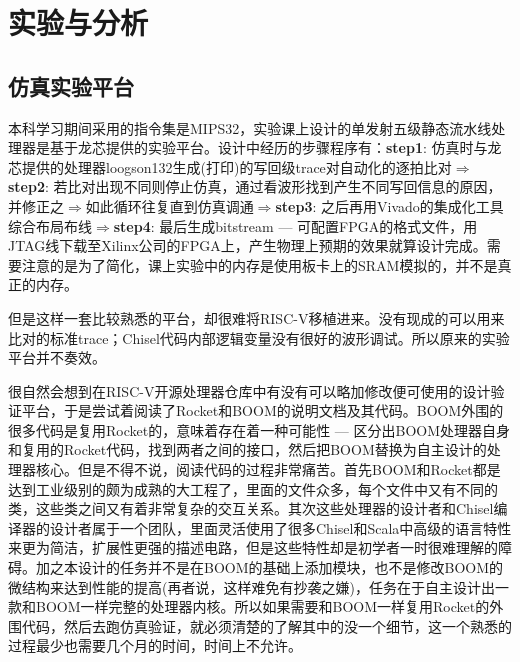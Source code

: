 \chapter{实验与分析}\label{chap:analysis}

\section{仿真实验平台}

本科学习期间采用的指令集是MIPS32，实验课上设计的单发射五级静态流水线处理器是基于龙芯提供的实验平台。设计中经历的步骤程序有：\textbf{step1}: 仿真时与龙芯提供的处理器loogson132生成(打印)的写回级trace对自动化的逐拍比对$ \Rightarrow $\textbf{step2}: 若比对出现不同则停止仿真，通过看波形找到产生不同写回信息的原因，并修正之$ \Rightarrow $如此循环往复直到仿真调通$ \Rightarrow $\textbf{step3}: 之后再用Vivado的集成化工具综合布局布线$ \Rightarrow $\textbf{step4}: 最后生成bitstream --- 可配置FPGA的格式文件，用JTAG线下载至Xilinx公司的FPGA上，产生物理上预期的效果就算设计完成。需要注意的是为了简化，课上实验中的内存是使用板卡上的SRAM模拟的，并不是真正的内存。

但是这样一套比较熟悉的平台，却很难将RISC-V移植进来。没有现成的可以用来比对的标准trace；Chisel代码内部逻辑变量没有很好的波形调试。所以原来的实验平台并不奏效。

很自然会想到在RISC-V开源处理器仓库中有没有可以略加修改便可使用的设计验证平台，于是尝试着阅读了Rocket和BOOM的说明文档及其代码。BOOM外围的很多代码是复用Rocket的，意味着存在着一种可能性 --- 区分出BOOM处理器自身和复用的Rocket代码，找到两者之间的接口，然后把BOOM替换为自主设计的处理器核心。但是不得不说，阅读代码的过程非常痛苦。首先BOOM和Rocket都是达到工业级别的颇为成熟的大工程了，里面的文件众多，每个文件中又有不同的类，这些类之间又有着非常复杂的交互关系。其次这些处理器的设计者和Chisel编译器的设计者属于一个团队，里面灵活使用了很多Chisel和Scala中高级的语言特性来更为简洁，扩展性更强的描述电路，但是这些特性却是初学者一时很难理解的障碍。加之本设计的任务并不是在BOOM的基础上添加模块，也不是修改BOOM的微结构来达到性能的提高(再者说，这样难免有抄袭之嫌)，任务在于自主设计出一款和BOOM一样完整的处理器内核。所以如果需要和BOOM一样复用Rocket的外围代码，然后去跑仿真验证，就必须清楚的了解其中的没一个细节，这一个熟悉的过程最少也需要几个月的时间，时间上不允许。

